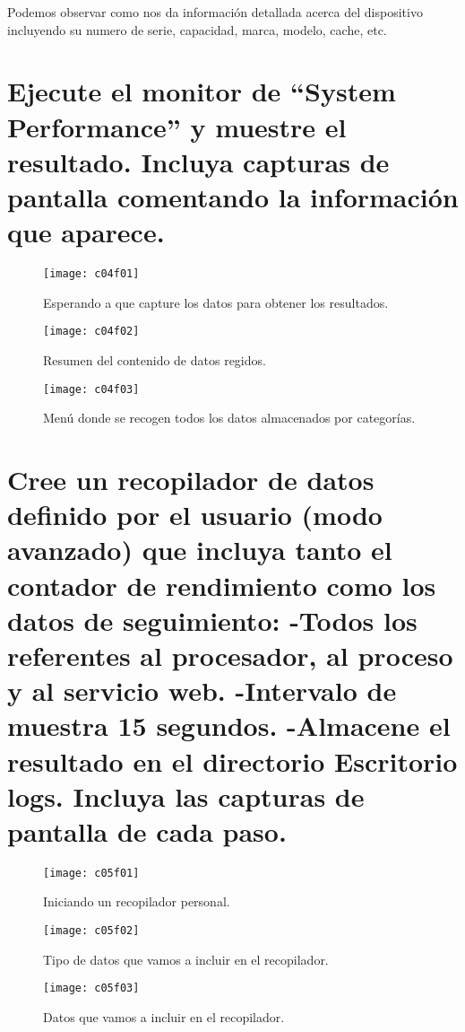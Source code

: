 Podemos observar como nos da información detallada acerca del dispositivo incluyendo su numero de serie, capacidad, marca, modelo, cache, etc.

\section{Ejecute el monitor de “System Performance” y muestre el resultado. Incluya capturas de pantalla comentando la información que aparece.}


\begin{figure}[H]
	\centering
	\texttt{[image: c04f01]}
	\caption{Esperando a que capture los datos para obtener los resultados.}
	\label{fig:c04f01}
\end{figure}
\begin{figure}[H]
	\centering
	\texttt{[image: c04f02]}
	\caption{Resumen del contenido de datos regidos.}
	\label{fig:c04f02}
\end{figure}
\begin{figure}[H]
	\centering
	\texttt{[image: c04f03]}
	\caption{Menú donde se recogen todos los datos almacenados por categorías.}
	\label{fig:c04f03}
\end{figure}



\clearpage
\section{Cree un recopilador de datos definido por el usuario (modo	avanzado) que incluya tanto el contador de rendimiento como los datos de 	seguimiento: -Todos los referentes al procesador, al proceso y al servicio web. -Intervalo de muestra 15 segundos. -Almacene el resultado en el directorio Escritorio \\logs. Incluya las capturas de pantalla de cada paso.}

\begin{figure}[H]
	\centering
	\texttt{[image: c05f01]}
	\caption{Iniciando un recopilador personal.}
	\label{fig:c05f01}
\end{figure}
\begin{figure}[H]
	\centering
	\texttt{[image: c05f02]}
	\caption{Tipo de datos que vamos a incluir en el recopilador.}
	\label{fig:c05f02}
\end{figure}
\begin{figure}[H]
	\centering
	\texttt{[image: c05f03]}
	\caption{Datos que vamos a incluir en el recopilador.}
	\label{fig:c05f03}
\end{figure}

